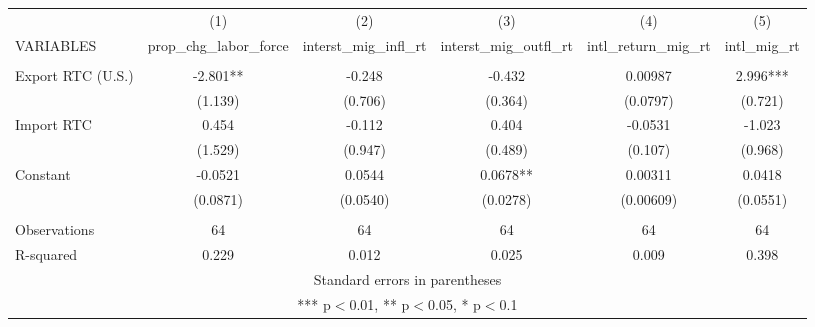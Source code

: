 \begin{tabular}{lccccc} \hline
 & (1) & (2) & (3) & (4) & (5) \\
VARIABLES & prop\_chg\_labor\_force & interst\_mig\_infl\_rt & interst\_mig\_outfl\_rt & intl\_return\_mig\_rt & intl\_mig\_rt \\ \hline
 &  &  &  &  &  \\
Export RTC (U.S.) & -2.801** & -0.248 & -0.432 & 0.00987 & 2.996*** \\
 & (1.139) & (0.706) & (0.364) & (0.0797) & (0.721) \\
Import RTC & 0.454 & -0.112 & 0.404 & -0.0531 & -1.023 \\
 & (1.529) & (0.947) & (0.489) & (0.107) & (0.968) \\
Constant & -0.0521 & 0.0544 & 0.0678** & 0.00311 & 0.0418 \\
 & (0.0871) & (0.0540) & (0.0278) & (0.00609) & (0.0551) \\
 &  &  &  &  &  \\
Observations & 64 & 64 & 64 & 64 & 64 \\
 R-squared & 0.229 & 0.012 & 0.025 & 0.009 & 0.398 \\ \hline
\multicolumn{6}{c}{ Standard errors in parentheses} \\
\multicolumn{6}{c}{ *** p$<$0.01, ** p$<$0.05, * p$<$0.1} \\
\end{tabular}
